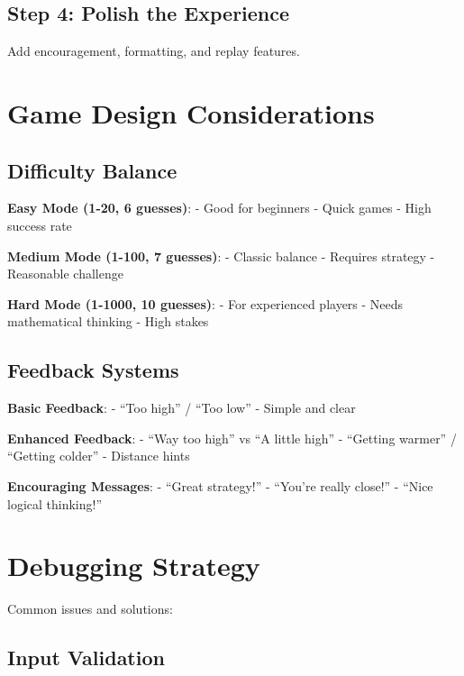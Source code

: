 \documentclass[
  letterpaper,
  DIV=11,
  numbers=noendperiod,
  oneside]{scrreprt}
\begin{document}
\subsection{Step 4: Polish the
Experience}\label{step-4-polish-the-experience}

Add encouragement, formatting, and replay features.

\section{Game Design Considerations}\label{game-design-considerations}

\subsection{Difficulty Balance}\label{difficulty-balance}

\textbf{Easy Mode (1-20, 6 guesses)}: - Good for beginners - Quick games
- High success rate

\textbf{Medium Mode (1-100, 7 guesses)}: - Classic balance - Requires
strategy - Reasonable challenge

\textbf{Hard Mode (1-1000, 10 guesses)}: - For experienced players -
Needs mathematical thinking - High stakes

\subsection{Feedback Systems}\label{feedback-systems}

\textbf{Basic Feedback}: - ``Too high'' / ``Too low'' - Simple and clear

\textbf{Enhanced Feedback}: - ``Way too high'' vs ``A little high'' -
``Getting warmer'' / ``Getting colder'' - Distance hints

\textbf{Encouraging Messages}: - ``Great strategy!'' - ``You're really
close!'' - ``Nice logical thinking!''

\section{Debugging Strategy}\label{debugging-strategy-2}

Common issues and solutions:

\subsection{Input Validation}\label{input-validation}
\end{document}

